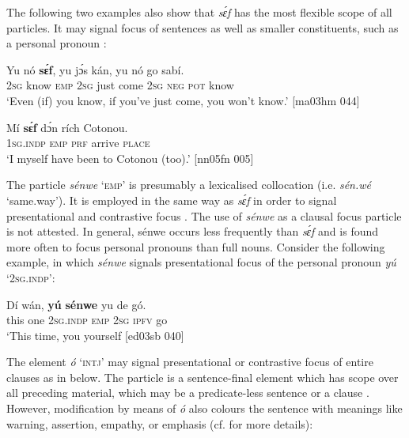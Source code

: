 The following two examples also show that \textit{sɛ́f} has the most flexible scope of all particles. It may signal focus of sentences  as well as smaller constituents, such as a personal pronoun : 



\ea%
    \label{ex:key:666}
    \gll Yu  nó    \textbf{sɛ́f},  yu  jɔ́s  kán,    yu  nó  go  sabí.\\
\textsc{2sg}  know  \textsc{emp}  \textsc{2sg}  just  come  \textsc{2sg}  \textsc{neg}  \textsc{pot}  know  \\

\glt ‘Even (if) you know, if you’ve just come, you won’t know.’ [ma03hm 044]
\z


\ea%
    \label{ex:key:667}
    \gll Mí    \textbf{sɛ́f}  dɔ́n  rích    Cotonou.\\
\textsc{1sg.indp}  \textsc{emp}  \textsc{prf}  arrive  \textsc{place}\\

\glt ‘I myself have been to Cotonou (too).’ [nn05fn 005]
\z

The particle \textit{sénwe} ‘\textsc{emp}’ is presumably a lexicalised collocation (i.e. \textit{sén.wé} ‘same.way’). It is employed in the same way as \textit{sɛ́f} in order to signal presentational and contrastive focus{\fff} . The use of \textit{sénwe} as a clausal focus particle is not attested. In general, sénwe occurs less frequently than \textit{sɛ́f} and is found more often to focus personal pronouns than full nouns. Consider the following example, in which \textit{sénwe} signals presentational focus of the personal pronoun \textit{yú} ‘\textsc{2sg.indp}’: 


\ea%
    \label{ex:key:668}
    \gll Dí  wán,  \textbf{yú}   \textbf{sénwe}  yu  de  gó.\\
this  one    \textsc{2sg.indp}  \textsc{emp}    \textsc{2sg}  \textsc{ipfv}  go\\

\glt ‘This time, you yourself  [ed03sb 040]
\z

The element \textit{ó} ‘\textsc{intj}’ may signal presentational or contrastive focus of entire clauses as in  below. The particle is a sentence-final element which has scope over all preceding material, which may be a predicate-less sentence  or a clause . However, modification by means of \textit{ó} also colours the sentence with meanings like warning, assertion, empathy, or emphasis (cf.  for more details): 



